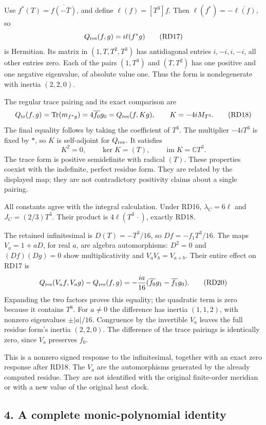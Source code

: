 \documentclass[
  10pt,
  a4paper,
]{article}
\begin{document}
Use \(f^*(T)=\overline{f(-\overline T)}\), and define
\(\ell(f)=[T^3]f\). Then \(\ell(f^*)=-\overline{\ell(f)}\), so \[
Q_{\rm res}(f,g)=i\ell(f^*g)
\tag{RD17}
\] is Hermitian. Its matrix in \((1,T,T^2,T^3)\) has antidiagonal
entries \(i,-i,i,-i\), all other entries zero. Each of the pairs
\((1,T^3)\) and \((T,T^2)\) has one positive and one negative
eigenvalue, of absolute value one. Thus the form is nondegenerate with
inertia \((2,2,0)\).

The regular trace pairing and its exact comparison are \[
Q_{\rm tr}(f,g)=\operatorname{Tr}(m_{f^*g})=4\overline{f_0}g_0
=Q_{\rm res}(f,Kg),\qquad K=-4iM_{T^3}.
\tag{RD18}
\] The final equality follows by taking the coefficient of \(T^3\). The
multiplier \(-4iT^3\) is fixed by \(*\), so \(K\) is self-adjoint for
\(Q_{\rm res}\). It satisfies \[
K^2=0,\qquad \ker K=(T),\qquad \operatorname{im}K=\mathbb CT^3.
\tag{RD19}
\] The trace form is positive semidefinite with radical \((T)\). These
properties coexist with the indefinite, perfect residue form. They are
related by the displayed map; they are not contradictory positivity
claims about a single pairing.

All constants agree with the integral calculation. Under RD16,
\(\lambda_C=6\ell\) and \(J_C=(2/3)T^3\). Their product is
\(4\ell(T^3\,\cdot)\), exactly RD18.

The retained infinitesimal is \(D(T)=-T^3/16\), so \(Df=-f_1T^3/16\).
The maps \(V_a=1+aD\), for real \(a\), are algebra automorphisms:
\(D^2=0\) and \((Df)(Dg)=0\) show multiplicativity and
\(V_aV_b=V_{a+b}\). Their entire effect on RD17 is \[
Q_{\rm res}(V_af,V_ag)-Q_{\rm res}(f,g)
=-\frac{ia}{16}(\overline{f_0}g_1-\overline{f_1}g_0).
\tag{RD20}
\] Expanding the two factors proves this equality; the quadratic term is
zero because it contains \(T^6\). For \(a\ne0\) the difference has
inertia \((1,1,2)\), with nonzero eigenvalues \(\pm |a|/16\). Congruence
by the invertible \(V_a\) leaves the full residue form's inertia
\((2,2,0)\). The difference of the trace pairings is identically zero,
since \(V_a\) preserves \(f_0\).

This is a nonzero signed response to the infinitesimal, together with an
exact zero response after RD18. The \(V_a\) are the automorphisms
generated by the already computed residue. They are not identified with
the original finite-order meridian or with a new value of the original
heat clock.

\subsection{4. A complete monic-polynomial
identity}\label{a-complete-monic-polynomial-identity}
\end{document}
